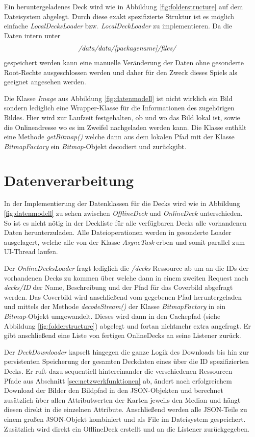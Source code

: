 Ein heruntergeladenes Deck wird wie in Abbildung \ref{fig:folderstructure} auf dem Dateisystem abgelegt. Durch diese exakt spezifizierte Struktur ist es möglich einfache \emph{LocalDecksLoader} bzw. \emph{LocalDeckLoader} zu implementieren. Da die Daten intern unter 
\begin{align*}
\emph{/data/data/[packagename]/files/}
\end{align*}
gespeichert werden kann eine manuelle Veränderung der Daten ohne gesonderte Root-Rechte ausgeschlossen werden und daher für den Zweck dieses Spiels als geeignet angesehen werden.

Die Klasse \emph{Image} aus Abbildung \ref{fig:datenmodell} ist nicht wirklich ein Bild sondern lediglich eine Wrapper-Klasse für die Informationen des zugehörigen Bildes. Hier wird zur Laufzeit festgehalten, ob und wo das Bild lokal ist, sowie die Onlineadresse wo es im Zweifel nachgeladen werden kann. Die Klasse enthält eine Methode \emph{getBitmap()} welche dann aus dem lokalen Pfad mit der Klasse \emph{BitmapFactory} ein \emph{Bitmap}-Objekt decodiert und zurückgibt.


\section{Datenverarbeitung}
In der Implementierung der Datenklassen für die Decks wird wie in Abbildung \ref{fig:datenmodell} zu sehen zwischen \emph{OfflineDeck} und \emph{OnlineDeck} unterschieden. So ist es nicht nötig in der Deckliste für alle verfügbaren Decks alle vorhandenen Daten herunterzuladen. Alle Dateioperationen werden in gesonderte Loader ausgelagert, welche alle von der Klasse \emph{AsyncTask} erben und somit parallel zum UI-Thread laufen.

Der \emph{OnlineDecksLoader} fragt lediglich die \emph{/decks} Ressource ab um an die IDs der vorhandenen Decks zu kommen über welche dann in einem zweiten Request nach \emph{decks/ID} der Name, Beschreibung und der Pfad für das Coverbild abgefragt werden. Das Coverbild wird anschließend vom gegebenen Pfad heruntergeladen und mittels der Methode \emph{decodeStream()} der Klasse \emph{BitmapFactory} in ein \emph {Bitmap}-Objekt umgewandelt. Dieses wird dann in den Cachepfad (siehe Abbildung \ref{fig:folderstructure}) abgelegt und fortan nichtmehr extra angefragt. Er gibt anschließend eine Liste von fertigen OnlineDecks an seine Listener zurück.

Der \emph{DeckDownloader} kapselt hingegen die ganze Logik des Downloads bis hin zur persistenten Speicherung der gesamten Deckdaten eines über die ID spezifizierten Decks. Er ruft dazu sequentiell hintereinander die verschiedenen Ressourcen-Pfade aus Abschnitt \ref{sec:netzwerkfunktionen} ab, ändert nach erfolgreichem Download der Bilder den Bildpfad in den JSON-Objekten und berechnet zusätzlich über allen Attributwerten der Karten jeweils den Median und hängt diesen direkt in die einzelnen Attribute. Anschließend werden alle JSON-Teile zu einem großen JSON-Objekt kombiniert und als File im Dateisystem gespeichert. Zusätzlich wird direkt ein OfflineDeck erstellt und an die Listener zurückgegeben.


